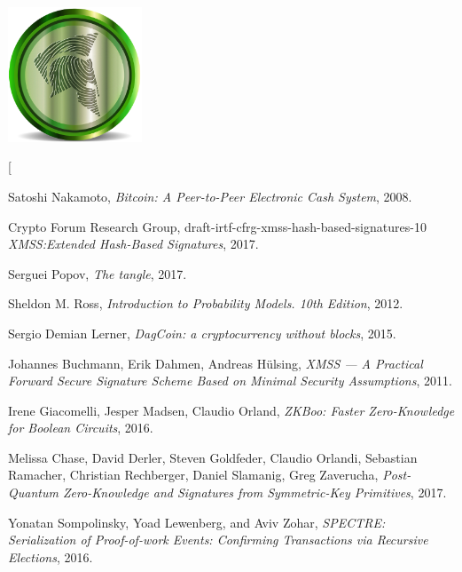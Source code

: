 \documentclass[a4paper,10pt,twocolumn]{article}
\begin{document}
	\vspace{3cm}
	
	\begin{center}
	\includegraphics[width=40mm]{logo-min}
	\end{center}
	
	  \twocolumn[
		\begin{@twocolumnfalse}
	
	
	  \begin{thebibliography}{99}
		
			Satoshi Nakamoto,
			\emph{Bitcoin: A Peer-to-Peer Electronic Cash System}, 2008.
		
		Crypto Forum Research Group, draft-irtf-cfrg-xmss-hash-based-signatures-10
			\emph{XMSS:Extended Hash-Based Signatures}, 2017.
			
		Serguei Popov,
			\emph{The tangle}, 2017.
		
		Sheldon M. Ross,
			\emph{Introduction to Probability Models. 10th Edition}, 2012.
		
		Sergio Demian Lerner,
			\emph{DagCoin: a cryptocurrency without blocks}, 2015.
		
		Johannes Buchmann, Erik Dahmen, Andreas H\"ulsing,
			\emph{XMSS --- A Practical Forward Secure Signature Scheme Based on Minimal Security Assumptions}, 2011.
		
		Irene Giacomelli, Jesper Madsen, Claudio Orland,
			\emph{ZKBoo: Faster Zero-Knowledge for Boolean Circuits}, 2016.
			
		Melissa Chase, David Derler, Steven Goldfeder, Claudio Orlandi, Sebastian Ramacher, Christian Rechberger, Daniel Slamanig, Greg Zaverucha,
			\emph{Post-Quantum Zero-Knowledge and Signatures from Symmetric-Key Primitives}, 2017.
			
		Yonatan Sompolinsky, Yoad Lewenberg, and Aviv Zohar, 
			\emph{SPECTRE\@:	Serialization of Proof-of-work Events: Confirming Transactions via Recursive Elections}, 2016.
		

\end{thebibliography}
\end{@twocolumnfalse}
\end{document}
